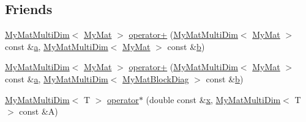 \subsection*{Friends}
\begin{DoxyCompactItemize}
\item 
\hyperlink{classTspeed_1_1MyMatMultiDim}{My\-Mat\-Multi\-Dim}$<$ \hyperlink{classTspeed_1_1MyMat}{My\-Mat} $>$ \hyperlink{classTspeed_1_1MyMatMultiDim_a0f13d96f443b5d3fe2e0ce2f128f5c28}{operator+} (\hyperlink{classTspeed_1_1MyMatMultiDim}{My\-Mat\-Multi\-Dim}$<$ \hyperlink{classTspeed_1_1MyMat}{My\-Mat} $>$ const \&\hyperlink{load__and__plot__lamb_8m_aa875ab3a8009406dcace7fa71a0f490d}{a}, \hyperlink{classTspeed_1_1MyMatMultiDim}{My\-Mat\-Multi\-Dim}$<$ \hyperlink{classTspeed_1_1MyMat}{My\-Mat} $>$ const \&\hyperlink{load__and__plot__lamb_8m_a21c7e548e910bb7ce7dcea81de72c8f7}{b})
\item 
\hyperlink{classTspeed_1_1MyMatMultiDim}{My\-Mat\-Multi\-Dim}$<$ \hyperlink{classTspeed_1_1MyMat}{My\-Mat} $>$ \hyperlink{classTspeed_1_1MyMatMultiDim_afe46b501e059ef54cd6701bfae967263}{operator+} (\hyperlink{classTspeed_1_1MyMatMultiDim}{My\-Mat\-Multi\-Dim}$<$ \hyperlink{classTspeed_1_1MyMat}{My\-Mat} $>$ const \&\hyperlink{load__and__plot__lamb_8m_aa875ab3a8009406dcace7fa71a0f490d}{a}, \hyperlink{classTspeed_1_1MyMatMultiDim}{My\-Mat\-Multi\-Dim}$<$ \hyperlink{classTspeed_1_1MyMatBlockDiag}{My\-Mat\-Block\-Diag} $>$ const \&\hyperlink{load__and__plot__lamb_8m_a21c7e548e910bb7ce7dcea81de72c8f7}{b})
\item 
\hyperlink{classTspeed_1_1MyMatMultiDim}{My\-Mat\-Multi\-Dim}$<$ T $>$ \hyperlink{classTspeed_1_1MyMatMultiDim_a10bafacdfbbd9746fab2e746196f4229}{operator$\ast$} (double const \&\hyperlink{vtk__mesh__out_8m_ace4b66138f2e64832c951b1ba9ce24cc}{x}, \hyperlink{classTspeed_1_1MyMatMultiDim}{My\-Mat\-Multi\-Dim}$<$ T $>$ const \&A)
\end{DoxyCompactItemize}


